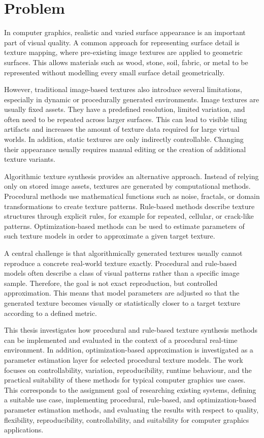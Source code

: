 \section{Problem}

In computer graphics, realistic and varied surface appearance is an important part of visual quality. A common approach for representing surface detail is texture mapping, where pre-existing image textures are applied to geometric surfaces. This allows materials such as wood, stone, soil, fabric, or metal to be represented without modelling every small surface detail geometrically.

However, traditional image-based textures also introduce several limitations, especially in dynamic or procedurally generated environments. Image textures are usually fixed assets. They have a predefined resolution, limited variation, and often need to be repeated across larger surfaces. This can lead to visible tiling artifacts and increases the amount of texture data required for large virtual worlds. In addition, static textures are only indirectly controllable. Changing their appearance usually requires manual editing or the creation of additional texture variants.

Algorithmic texture synthesis provides an alternative approach. Instead of relying only on stored image assets, textures are generated by computational methods. Procedural methods use mathematical functions such as noise, fractals, or domain transformations to create texture patterns. Rule-based methods describe texture structures through explicit rules, for example for repeated, cellular, or crack-like patterns. Optimization-based methods can be used to estimate parameters of such texture models in order to approximate a given target texture.

A central challenge is that algorithmically generated textures usually cannot reproduce a concrete real-world texture exactly. Procedural and rule-based models often describe a class of visual patterns rather than a specific image sample. Therefore, the goal is not exact reproduction, but controlled approximation. This means that model parameters are adjusted so that the generated texture becomes visually or statistically closer to a target texture according to a defined metric.

This thesis investigates how procedural and rule-based texture synthesis methods can be implemented and evaluated in the context of a procedural real-time environment. In addition, optimization-based approximation is investigated as a parameter estimation layer for selected procedural texture models. The work focuses on controllability, variation, reproducibility, runtime behaviour, and the practical suitability of these methods for typical computer graphics use cases. This corresponds to the assignment goal of researching existing systems, defining a suitable use case, implementing procedural, rule-based, and optimization-based parameter estimation methods, and evaluating the results with respect to quality, flexibility, reproducibility, controllability, and suitability for computer graphics applications.

